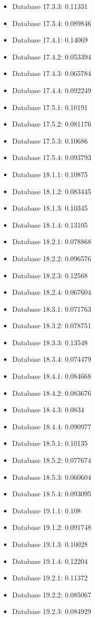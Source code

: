 \begin{itemize}
\item Database 17.3.3: 0.11331
\item Database 17.3.4: 0.089846
\item Database 17.4.1: 0.14069
\item Database 17.4.2: 0.053394
\item Database 17.4.3: 0.065784
\item Database 17.4.4: 0.092249
\item Database 17.5.1: 0.10191
\item Database 17.5.2: 0.081176
\item Database 17.5.3: 0.10686
\item Database 17.5.4: 0.093793
\item Database 18.1.1: 0.10875
\item Database 18.1.2: 0.083445
\item Database 18.1.3: 0.10345
\item Database 18.1.4: 0.13105
\item Database 18.2.1: 0.078868
\item Database 18.2.2: 0.096576
\item Database 18.2.3: 0.12568
\item Database 18.2.4: 0.067604
\item Database 18.3.1: 0.071763
\item Database 18.3.2: 0.078751
\item Database 18.3.3: 0.13548
\item Database 18.3.4: 0.074479
\item Database 18.4.1: 0.084668
\item Database 18.4.2: 0.083676
\item Database 18.4.3: 0.0834
\item Database 18.4.4: 0.090977
\item Database 18.5.1: 0.10135
\item Database 18.5.2: 0.077674
\item Database 18.5.3: 0.060604
\item Database 18.5.4: 0.093095
\item Database 19.1.1: 0.108
\item Database 19.1.2: 0.091748
\item Database 19.1.3: 0.10028
\item Database 19.1.4: 0.12204
\item Database 19.2.1: 0.11372
\item Database 19.2.2: 0.085067
\item Database 19.2.3: 0.084929

\end{itemize}
